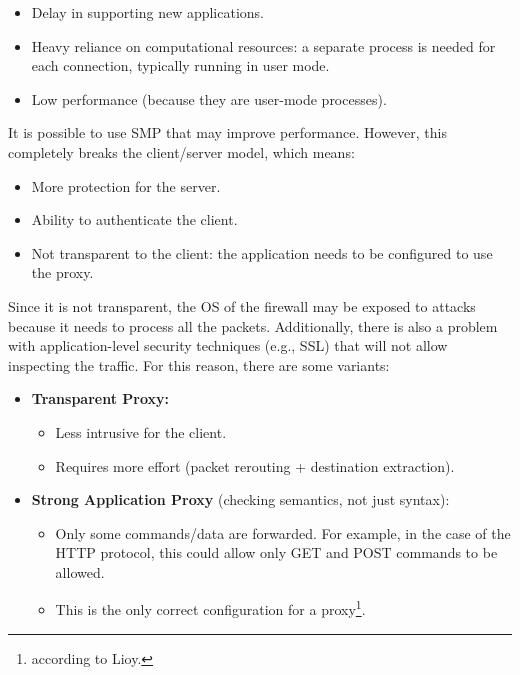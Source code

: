 \begin{itemize}
    \item Delay in supporting new applications.
    \item Heavy reliance on computational resources: a separate process is needed for each connection, typically running in user mode.
    \item Low performance (because they are user-mode processes).
\end{itemize}

It is possible to use SMP that may improve performance. However, this completely breaks the client/server model, which means:

\begin{itemize}
    \item More protection for the server.
    \item Ability to authenticate the client.
    \item Not transparent to the client: the application needs to be configured to use the proxy.
\end{itemize}

Since it is not transparent, the OS of the firewall may be exposed to attacks because it needs to process all the packets. Additionally, there is also a problem with application-level security techniques (e.g., SSL) that will not allow inspecting the traffic. For this reason, there are some variants:

\begin{itemize}
    \item \textbf{Transparent Proxy:}
          \begin{itemize}
              \item Less intrusive for the client.
              \item Requires more effort (packet rerouting + destination extraction).
          \end{itemize}

    \item \textbf{Strong Application Proxy} (checking semantics, not just syntax):
          \begin{itemize}
              \item Only some commands/data are forwarded. For example, in the case of the HTTP protocol, this could allow only GET and POST commands to be allowed.
              \item This is the only correct configuration for a proxy\footnote{according to Lioy.}.
          \end{itemize}
\end{itemize}



